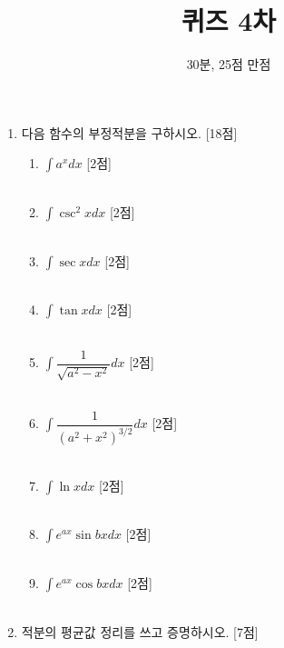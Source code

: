 \documentclass[12pt, a4paper]{article}
\title{퀴즈 4차}
\author{30분, 25점 만점}
\date{}
\begin{document}
\maketitle 
\begin{enumerate}
    \item  다음 함수의 부정적분을 구하시오. [18점]
    \begin{enumerate}
        \item $\displaystyle \int a^x dx$ [2점]\\ \\
        \item $\displaystyle \int \csc^2 x dx$ [2점]\\ \\
        \item $\displaystyle \int \sec x dx$ [2점]\\ \\
        \item $\displaystyle \int \tan x dx$ [2점]\\ \\
        \item $\displaystyle \int \dfrac{1}{\sqrt{a^2 - x^2}} dx$ [2점]\\ \\
        \item $\displaystyle \int \dfrac{1}{(a^2 + x^2)^{3/2}}dx$ [2점]\\ \\
        \item $\displaystyle \int \ln x dx$ [2점]\\ \\
        \item $\displaystyle \int e^{ax} \sin bx dx$ [2점]\\ \\
        \item $\displaystyle \int e^{ax} \cos bx dx$ [2점]\\ \\
    \end{enumerate} 

    \item 적분의 평균값 정리를 쓰고 증명하시오. [7점] \\ \\ \\ \\ \\ \\


\end{enumerate}
\end{document}
